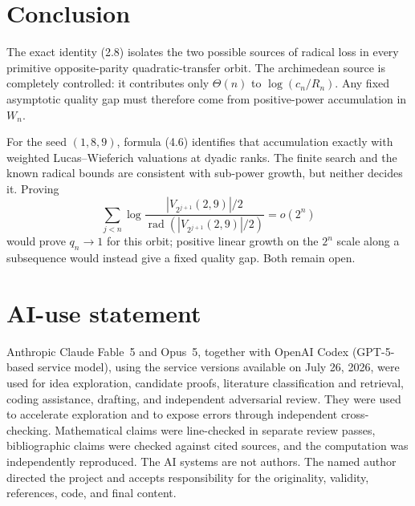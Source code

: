 \documentclass[11pt]{article}
\theoremstyle{remark}
\newcommand{\rad}{\operatorname{rad}}
\begin{document}
\section{Conclusion}

The exact identity (2.8) isolates the two possible sources of radical
loss in every primitive opposite-parity quadratic-transfer orbit.  The
archimedean source is completely controlled: it contributes only
\(\Theta(n)\) to \(\log(c_n/R_n)\).  Any fixed asymptotic quality gap
must therefore come from positive-power accumulation in \(W_n\).

For the seed \((1,8,9)\), formula (4.6) identifies that accumulation
exactly with weighted Lucas--Wieferich valuations at dyadic ranks.  The
finite search and the known radical bounds are consistent with
sub-power growth, but neither decides it.  Proving
\[
 \sum_{j<n}\log\frac{|V_{2^{j+1}}(2,9)|/2}
                         {\rad(|V_{2^{j+1}}(2,9)|/2)}
 =o(2^n)
\]
would prove \(q_n\to1\) for this orbit; positive linear growth on the
\(2^n\) scale along a subsequence would instead give a fixed quality
gap.  Both remain open.

\section*{AI-use statement}

Anthropic Claude Fable~5 and Opus~5, together with OpenAI Codex
(GPT-5-based service model), using the service versions available on
July 26, 2026, were used for idea exploration, candidate proofs,
literature classification and retrieval, coding assistance, drafting,
and independent adversarial review.  They were used to accelerate
exploration and to expose errors through independent cross-checking.
Mathematical claims were
line-checked in separate review passes, bibliographic claims were
checked against cited sources, and the computation was independently
reproduced.  The AI systems are not authors.  The named author directed
the project and accepts responsibility for the originality, validity,
references, code, and final content.
\end{document}
